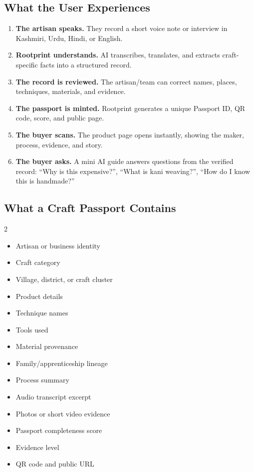 \documentclass[11pt,a4paper]{article}
\begin{document}
\subsection{What the User Experiences}

\begin{enumerate}
  \item \textbf{The artisan speaks.} They record a short voice note or interview in Kashmiri, Urdu, Hindi, or English.
  \item \textbf{Rootprint understands.} AI transcribes, translates, and extracts craft-specific facts into a structured record.
  \item \textbf{The record is reviewed.} The artisan/team can correct names, places, techniques, materials, and evidence.
  \item \textbf{The passport is minted.} Rootprint generates a unique Passport ID, QR code, score, and public page.
  \item \textbf{The buyer scans.} The product page opens instantly, showing the maker, process, evidence, and story.
  \item \textbf{The buyer asks.} A mini AI guide answers questions from the verified record: ``Why is this expensive?'', ``What is kani weaving?'', ``How do I know this is handmade?''
\end{enumerate}

\subsection{What a Craft Passport Contains}

\begin{multicols}{2}
\begin{itemize}
  \item Artisan or business identity
  \item Craft category
  \item Village, district, or craft cluster
  \item Product details
  \item Technique names
  \item Tools used
  \item Material provenance
  \item Family/apprenticeship lineage
  \item Process summary
  \item Audio transcript excerpt
  \item Photos or short video evidence
  \item Passport completeness score
  \item Evidence level
  \item QR code and public URL
\end{itemize}
\end{multicols}
\end{document}
